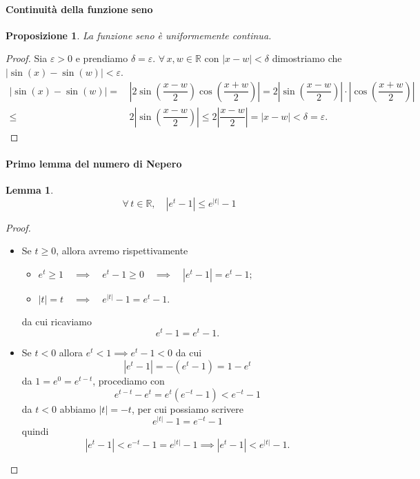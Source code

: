\documentclass{article}
\theoremstyle{plain}
\newtheorem{lem}[thm]{Lemma}
\newtheorem{prop}[thm]{Proposizione}
\theoremstyle{definition}
\theoremstyle{remark}
\begin{document}
\paragraph{Continuità della funzione seno}
\begin{bxthm}
\begin{prop}
    La funzione seno è uniformemente continua.
\end{prop}
\end{bxthm}
\begin{proof}
    Sia $\varepsilon>0$ e prendiamo $\delta=\varepsilon$.
    $\forall\, x,w\in\mathbb{R}$ con $|x-w|<\delta$ dimostriamo che \(|\sin(x)-\sin(w)|<\varepsilon\).
    \begin{align*}
        |\sin(x)-\sin(w)|=&\, \left|2\sin\left(\dfrac{x-w}{2}\right)\cos\left(\dfrac{x+w}{2}\right)\right|= 2\left|\sin\left(\dfrac{x-w}{2}\right)\right|\cdot\left|\cos\left(\dfrac{x+w}{2}\right)\right|\\
                         \leq&\,  2\left|\sin\left(\dfrac{x-w}{2}\right)\right|\leq  2\left|\dfrac{x-w}{2}\right|=|x-w|<\delta=\varepsilon.
    \end{align*}
\end{proof}

\vspace{10pt}

\paragraph{Primo lemma del numero di Nepero}
\begin{bxthm}
\begin{lem}
    \[\forall\,t\in\mathbb{R},\quad |e^t-1|\leq e^{|t|}-1\]
\end{lem}
\end{bxthm}
\begin{proof}\hfill
    \begin{itemize}
        \item Se $t\geq0$, allora avremo rispettivamente
        \begin{itemize}
            \item $e^t\geq1\quad\implies\quad e^t-1\geq0 \quad\implies\quad |e^t-1|=e^t-1;$
            \item $|t|=t \quad\implies\quad e^{|t|}-1=e^t-1.$
        \end{itemize}
        da cui ricaviamo \[e^t-1=e^t-1.\]
        \item Se $t<0$ allora $e^t<1\implies e^t-1<0$ da cui 
        \[|e^t-1|=-(e^t-1)=1-e^t\]
        da $1=e^0=e^{t-t}$, procediamo con
        \[e^{t-t}-e^t=e^t(e^{-t}-1)<e^{-t}-1\]
        da $t<0$ abbiamo $|t|=-t$, per cui possiamo scrivere
        \[e^{|t|}-1=e^{-t}-1\]
        quindi \[|e^t-1|<e^{-t}-1=e^{|t|}-1\implies |e^t-1|<e^{|t|}-1.\]
    \end{itemize}
\end{proof}
\end{document}
